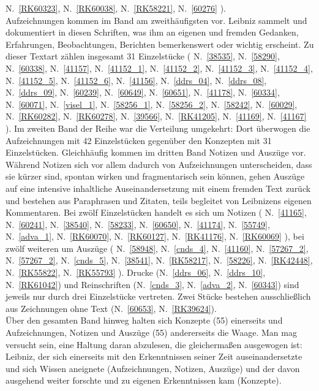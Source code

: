 N.~\ref{RK60323},
N.~\ref{RK60038},
N.~\ref{RK58221},
N.~\ref{60276}%
).
\\ \indent
Aufzeichnungen kommen im Band am zweithäufigsten vor. Leibniz sammelt und dokumentiert in diesen Schriften, was ihm an eigenen und fremden Gedanken, Erfahrungen, Beobachtungen, Berichten bemerkenswert oder wichtig erscheint. Zu dieser Textart zählen insgesamt 31 Einzelstücke (%
N.~\ref{38535},
N.~\ref{58290},
N.~\ref{60338},
N.~\ref{41157},
N.~\ref{41152_1},
N.~\ref{41152_2},
N.~\ref{41152_3},
N.~\ref{41152_4},
N.~\ref{41152_5},
N.~\ref{41152_6},
N.~\ref{41156},
N.~\ref{ddrs_04},
N.~\ref{ddrs_08},
N.~\ref{ddrs_09},
N.~\ref{60239},
N.~\ref{60649},
N.~\ref{60651},
N.~\ref{41178},
N.~\ref{60334},
N.~\ref{60071},
N.~\ref{visel_1},
N.~\ref{58256_1},
N.~\ref{58256_2},
N.~\ref{58242},
N.~\ref{60029},
N.~\ref{RK60282},
N.~\ref{RK60278},
N.~\ref{39566},
N.~\ref{RK41205},
N.~\ref{41169},
N.~\ref{41167}%
). 
Im zweiten Band der Reihe war die Verteilung umgekehrt: Dort überwogen die Aufzeichnungen mit 42 Einzelstücken gegenüber den Konzepten mit 31 Einzelstücken.
Gleichhäufig kommen im dritten Band Notizen und Auszüge vor. Während Notizen sich vor allem dadurch von Aufzeichnungen unterscheiden, dass sie kürzer sind, spontan wirken und fragmentarisch sein können, gehen Auszüge auf eine intensive inhaltliche Auseinandersetzung mit einem fremden Text zurück und bestehen aus Paraphrasen und Zitaten, teils begleitet von Leibnizens eigenen Kommentaren. Bei zwölf Einzelstücken handelt es sich um Notizen (%
N.~\ref{41165},
N.~\ref{60241},
N.~\ref{38540},
N.~\ref{58233},
N.~\ref{60650},
N.~\ref{41174},
N.~\ref{55749},
N.~\ref{adva_1},
N.~\ref{RK60070},
N.~\ref{RK60127},
N.~\ref{RK41176},
N.~\ref{RK60069}%
), bei zwölf weiteren um Auszüge (%
N.~\ref{58948},
N.~\ref{cnds_4},
N.~\ref{41160},
N.~\ref{57267_2},
N.~\ref{57267_2},
N.~\ref{cnds_5},
N.~\ref{38541},
N.~\ref{RK58217},
N.~\ref{58226},
N.~\ref{RK42448},
N.~\ref{RK55822},
N.~\ref{RK55793}%
). Drucke (N.~\ref{ddrs_06}, N.~\ref{ddrs_10}, N.~\ref{RK61042}) und  Reinschriften (N.~\ref{cnds_3}, N.~\ref{adva_2}, N.~\ref{60343}) sind jeweils nur durch drei Einzelstücke vertreten. Zwei Stücke bestehen ausschließlich aus Zeichnungen ohne Text (N.~\ref{60653}, N.~\ref{RK39624}). 
\\ \indent
Über den gesamten Band hinweg halten sich Konzepte (55) einerseits und Aufzeichnungen, Notizen und Auszüge (55) andererseits die Waage. 
Man mag versucht sein, eine Haltung daran abzulesen, die gleichermaßen ausgewogen ist: Leibniz, der sich einerseits mit den Erkenntnissen seiner Zeit auseinandersetzte und sich Wissen aneignete (Aufzeichnungen, Notizen, Auszüge) und der davon ausgehend weiter forschte und zu eigenen Erkenntnissen kam (Konzepte).

